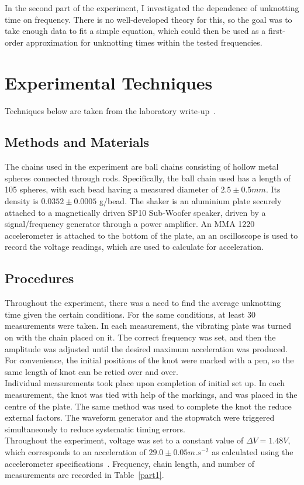 \documentclass[12pt]{IEEEtran}
\begin{document}
In the second part of the experiment, I investigated the dependence of unknotting time on frequency. There is no well-developed theory for this, so the goal was to take enough data to fit a simple equation, which could then be used as a first-order approximation for unknotting times within the tested frequencies.

\section{Experimental Techniques}

Techniques below are taken from the laboratory write-up~\cite{manual}.

\subsection{Methods and Materials}

The chains used in the experiment are ball chains consisting of hollow metal spheres connected through rods. Specifically, the ball chain used has a length of 105 spheres, with each bead having a measured diameter of $2.5\pm0.5\unit{mm}$. Its density is $0.0352 \pm 0.0005$ g/bead. The shaker is an aluminium plate securely attached to a magnetically driven SP10 Sub-Woofer speaker, driven by a signal/frequency generator through a power amplifier. An MMA 1220 accelerometer is attached to the bottom of the plate, an an oscilloscope is used to record the voltage readings, which are used to calculate for acceleration.

\subsection{Procedures}

Throughout the experiment, there was a need to find the average unknotting time given the certain conditions. For the same conditions, at least 30 measurements were taken. In each measurement, the vibrating plate was turned on with the chain placed on it. The correct frequency was set, and then the amplitude was adjusted until the desired maximum acceleration was produced. For convenience, the initial positions of the knot were marked with a pen, so the same length of knot can be retied over and over. \\
Individual measurements took place upon completion of initial set up. In each measurement, the knot was tied with help of the markings, and was placed in the centre of the plate. The same method was used to complete the knot the reduce external factors. The waveform generator and the stopwatch were triggered simultaneously to reduce systematic timing errors. \\
Throughout the experiment, voltage was set to a constant value of $\Delta V = 1.48\unit{V}$, which corresponds to an acceleration of $29.0 \pm 0.05 \unit{m.s^{-2}}$ as calculated using the accelerometer specifications~\cite{accelerometer}. Frequency, chain length, and number of measurements are recorded in Table~\ref{part1}.
\end{document}
